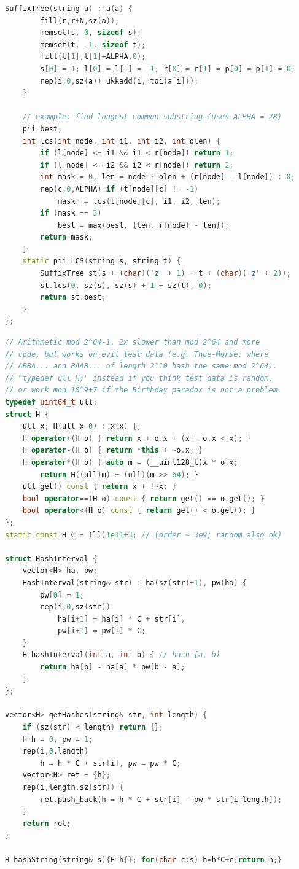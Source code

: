\begin{multicols}{\Columns}
\begin{lstlisting}[language=C++]
	SuffixTree(string a) : a(a) {
		fill(r,r+N,sz(a));
		memset(s, 0, sizeof s);
		memset(t, -1, sizeof t);
		fill(t[1],t[1]+ALPHA,0);
		s[0] = 1; l[0] = l[1] = -1; r[0] = r[1] = p[0] = p[1] = 0;
		rep(i,0,sz(a)) ukkadd(i, toi(a[i]));
	}

	// example: find longest common substring (uses ALPHA = 28)
	pii best;
	int lcs(int node, int i1, int i2, int olen) {
		if (l[node] <= i1 && i1 < r[node]) return 1;
		if (l[node] <= i2 && i2 < r[node]) return 2;
		int mask = 0, len = node ? olen + (r[node] - l[node]) : 0;
		rep(c,0,ALPHA) if (t[node][c] != -1)
			mask |= lcs(t[node][c], i1, i2, len);
		if (mask == 3)
			best = max(best, {len, r[node] - len});
		return mask;
	}
	static pii LCS(string s, string t) {
		SuffixTree st(s + (char)('z' + 1) + t + (char)('z' + 2));
		st.lcs(0, sz(s), sz(s) + 1 + sz(t), 0);
		return st.best;
	}
};
\end{lstlisting}

\begin{lstlisting}[language=C++]
// Arithmetic mod 2^64-1. 2x slower than mod 2^64 and more
// code, but works on evil test data (e.g. Thue-Morse, where
// ABBA... and BAAB... of length 2^10 hash the same mod 2^64).
// "typedef ull H;" instead if you think test data is random,
// or work mod 10^9+7 if the Birthday paradox is not a problem.
typedef uint64_t ull;
struct H {
	ull x; H(ull x=0) : x(x) {}
	H operator+(H o) { return x + o.x + (x + o.x < x); }
	H operator-(H o) { return *this + ~o.x; }
	H operator*(H o) { auto m = (__uint128_t)x * o.x;
		return H((ull)m) + (ull)(m >> 64); }
	ull get() const { return x + !~x; }
	bool operator==(H o) const { return get() == o.get(); }
	bool operator<(H o) const { return get() < o.get(); }
};
static const H C = (ll)1e11+3; // (order ~ 3e9; random also ok)

struct HashInterval {
	vector<H> ha, pw;
	HashInterval(string& str) : ha(sz(str)+1), pw(ha) {
		pw[0] = 1;
		rep(i,0,sz(str))
			ha[i+1] = ha[i] * C + str[i],
			pw[i+1] = pw[i] * C;
	}
	H hashInterval(int a, int b) { // hash [a, b)
		return ha[b] - ha[a] * pw[b - a];
	}
};

vector<H> getHashes(string& str, int length) {
	if (sz(str) < length) return {};
	H h = 0, pw = 1;
	rep(i,0,length)
		h = h * C + str[i], pw = pw * C;
	vector<H> ret = {h};
	rep(i,length,sz(str)) {
		ret.push_back(h = h * C + str[i] - pw * str[i-length]);
	}
	return ret;
}

H hashString(string& s){H h{}; for(char c:s) h=h*C+c;return h;}
\end{lstlisting}


\end{multicols}
